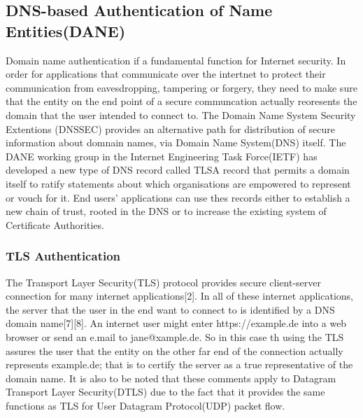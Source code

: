 \subsection{DNS-based Authentication of Name Entities(DANE)}
Domain name authentication if a fundamental function for Internet security. In order for applications that communicate over the intertnet to protect their communication from eavesdropping, tampering or forgery, they need to make sure that the entity on the end point of a secure communcation actually reoresents the domain that the user intended to connect to. The Domain Name System Security Extentions (DNSSEC) provides an alternative path for distribution of secure information about domnain names, via Domain Name System(DNS) itself. The DANE working group in the Internet Engineering Task Force(IETF) has developed a new type of DNS record called TLSA record that permits a domain itself to ratify statements about which organisations are empowered to represent or vouch for it. End users' applications can use thes records either to establish a new chain of trust, rooted in the DNS or to increase the existing system of Certificate Authorities.
\subsubsection{TLS Authentication}
The Transport Layer Security(TLS) protocol provides secure client-server connection for many internet applications[2]. In all of these internet applications, the server that the user in the end want to connect to is identified by a DNS domain name[7][8]. An internet user might enter https://example.de into a web browser or send an e.mail to jane@xample.de. So in this case th using the TLS  assures the user that the entity on the other far end of the connection actually represents example.de; that is to certify the server as a true representative of the domain name. It is also to be noted that these comments apply to Datagram Transport Layer Security(DTLS) due to the fact that it provides the same functions as TLS for User Datagram Protocol(UDP) packet flow.
